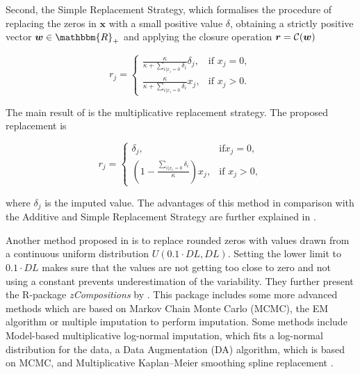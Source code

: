 Second, the Simple Replacement Strategy, which formalises the procedure of replacing the zeros in $\bm{x}$ with a small positive value $\delta$, obtaining a strictly positive vector $\bm{w} \in \mathbbm{R}_+$ and applying the closure operation $\bm{r}=\mathcal{C}(\bm{w})$

\begin{equation}
r_j = 
\begin{cases}
\frac{\kappa}{\kappa + \sum_{i| x_i=0}\delta_i } \delta_j, & \text{if } x_j=0, \\
\frac{\kappa}{\kappa + \sum_{i| x_i=0}\delta_i } x_j, & \text{if } x_j>0.
\end{cases}
\label{eq:simple replacement strategy}
\end{equation}

The main result of \cite{Josep:2003} is the multiplicative replacement strategy. The proposed replacement is 

\begin{equation}
r_j = 
\begin{cases}
\delta_j, & \text{if} x_j=0, \\
\left( 1- \frac{\sum_{i | x_i=0}\delta_i}{\kappa} \right)x_j, & \text{if } x_j>0, 
\end{cases}
\label{eq:multiplicative replacement strategy}
\end{equation}

where $\delta_j$ is the imputed value. The advantages of this method in comparison with the Additive and Simple Replacement Strategy are further explained in \cite{Josep:2003}.

Another method proposed in \cite{Lubbe:2021} is to replace rounded zeros with values drawn from a continuous uniform distribution $U(0.1\cdot DL,DL)$. Setting the lower limit to $0.1\cdot DL$ makes sure that the values are not getting too close to zero and not using a constant prevents underestimation of the variability. They further present the R-package \textit{zCompositions} by \cite{Palarea-Albaladejo:2015}. This package includes some more advanced methods which are based on Markov Chain Monte Carlo (MCMC), the EM algorithm or multiple imputation to perform imputation. Some methods include Model-based multiplicative log-normal imputation, which fits a log-normal distribution for the data, a Data Augmentation (DA) algorithm, which is based on MCMC, and Multiplicative Kaplan–Meier smoothing spline replacement \cite{Palarea-Albaladejo:2015}.



